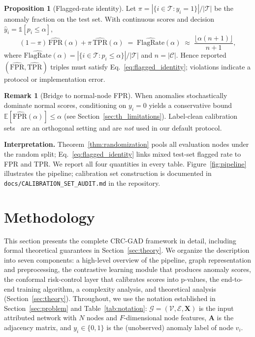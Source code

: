 \documentclass[a4paper]{cas-dc}
\theoremstyle{definition}
\newtheorem{proposition}{Proposition}
\newtheorem{remark}{Remark}
\begin{document}
\begin{proposition}[Flagged-rate identity]
\label{prop:flagged}
Let $\pi = |\{i \in \mathcal{T}: y_i = 1\}| / |\mathcal{T}|$ be the anomaly fraction on the test set.  With continuous scores and decision $\hat{y}_i = \mathbb{1}[p_i \leq \alpha]$,
\begin{equation}
\label{eq:flagged_identity}
    (1-\pi)\,\widehat{\mathrm{FPR}}(\alpha) + \pi\,\widehat{\mathrm{TPR}}(\alpha)
    \;=\; \widehat{\mathrm{FlagRate}}(\alpha)
    \;\approx\; \frac{\lfloor \alpha(n+1)\rfloor}{n+1},
\end{equation}
where $\widehat{\mathrm{FlagRate}}(\alpha) = |\{i \in \mathcal{T}: p_i \leq \alpha\}| / |\mathcal{T}|$ and $n = |\mathcal{C}|$.  Hence reported $(\widehat{\mathrm{FPR}}, \widehat{\mathrm{TPR}})$ triples must satisfy Eq.~\eqref{eq:flagged_identity}; violations indicate a protocol or implementation error.
\end{proposition}

\begin{remark}[Bridge to normal-node FPR]
When anomalies stochastically dominate normal scores, conditioning on $y_i=0$ yields a conservative bound $\mathbb{E}[\widehat{\mathrm{FPR}}(\alpha)] \leq \alpha$ (see Section~\ref{sec:th_limitations}).  Label-clean calibration sets~\cite{bates2023testing} are an orthogonal setting and are \emph{not} used in our default protocol.
\end{remark}

\noindent\textbf{Interpretation.} Theorem~\ref{thm:randomization} pools all evaluation nodes under the random split; Eq.~\eqref{eq:flagged_identity} links mixed test-set flagged rate to FPR and TPR.  We report all four quantities in every table.  Figure~\ref{fig:pipeline} illustrates the pipeline; calibration set construction is documented in \texttt{docs/CALIBRATION\_SET\_AUDIT.md} in the repository.

\section{Methodology}
\label{sec:method}

This section presents the complete CRC-GAD framework in detail, including formal theoretical guarantees in Section~\ref{sec:theory}. We organize the description into seven components: a high-level overview of the pipeline, graph representation and preprocessing, the contrastive learning module that produces anomaly scores, the conformal risk-control layer that calibrates scores into p-values, the end-to-end training algorithm, a complexity analysis, and theoretical analysis (Section~\ref{sec:theory}). Throughout, we use the notation established in Section~\ref{sec:problem} and Table~\ref{tab:notation}: $\mathcal{G} = (\mathcal{V}, \mathcal{E}, \mathbf{X})$ is the input attributed network with $N$ nodes and $F$-dimensional node features, $\mathbf{A}$ is the adjacency matrix, and $y_i \in \{0,1\}$ is the (unobserved) anomaly label of node $v_i$.
\end{document}
